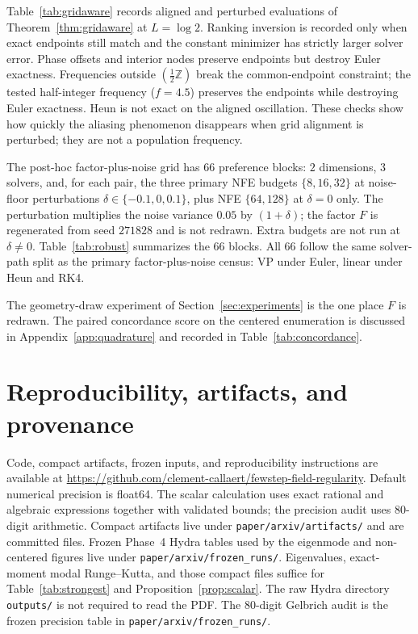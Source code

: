 \documentclass[11pt,a4paper]{article}
\theoremstyle{remark}
\newcommand{\cR}{\mathcal{R}}
\begin{document}
Table~\ref{tab:gridaware} records aligned and perturbed evaluations of
Theorem~\ref{thm:gridaware} at $L=\log 2$. Ranking inversion is recorded
only when exact endpoints still match and the constant minimizer has
strictly larger solver error. Phase offsets and interior nodes preserve
endpoints but destroy Euler exactness. Frequencies outside
$(\tfrac12\mathbb{Z})$ break the common-endpoint constraint; the tested
half-integer frequency ($f=4.5$) preserves the endpoints while destroying
Euler exactness. Heun is not exact on the aligned oscillation.
These checks show how quickly the aliasing phenomenon disappears when
grid alignment is perturbed; they are not a population frequency.

\begin{table}[ht]
  \centering
  \caption{Grid-aware robustness at $L=\log 2$. ``Ends'' records whether
  the two exact endpoints still match. ``Invert'' records whether the
  constant $\cR$-minimizer has strictly larger solver error.}
  \label{tab:gridaware}
  \scriptsize
  
\end{table}


The post-hoc factor-plus-noise grid has $66$ preference blocks:
$2$ dimensions, $3$ solvers, and, for each pair, the three primary NFE
budgets $\{8,16,32\}$ at noise-floor perturbations
$\delta\in\{-0.1,0,0.1\}$, plus NFE $\{64,128\}$ at $\delta=0$ only. The
perturbation multiplies the noise variance $0.05$ by $(1+\delta)$; the
factor $F$ is regenerated from seed $271828$ and is not redrawn. Extra
budgets are not run at $\delta\ne 0$. Table~\ref{tab:robust} summarizes the
$66$ blocks. All $66$ follow the same solver-path split as the primary
factor-plus-noise census: VP under Euler, linear under Heun and RK4.

The geometry-draw experiment of Section~\ref{sec:experiments} is the
one place $F$ is redrawn. The paired concordance score on the centered
enumeration is discussed in Appendix~\ref{app:quadrature} and recorded in
Table~\ref{tab:concordance}.
\section{Reproducibility, artifacts, and provenance}
\label{app:repro}

{\small\raggedright
Code, compact artifacts, frozen inputs, and reproducibility instructions
are available at
\url{https://github.com/clement-callaert/fewstep-field-regularity}.
Default numerical precision is float64. The scalar calculation uses exact
rational and algebraic expressions together with validated bounds; the
precision audit uses $80$-digit arithmetic. Compact artifacts live under
\texttt{paper/arxiv/artifacts/} and are committed files. Frozen Phase~4
Hydra tables used by the eigenmode and non-centered figures live under
\texttt{paper/arxiv/frozen\_runs/}. Eigenvalues, exact-moment modal
Runge--Kutta, and those compact files suffice for
Table~\ref{tab:strongest} and Proposition~\ref{prop:scalar}. The raw
Hydra directory \texttt{outputs/} is not required to read the PDF.
The $80$-digit Gelbrich audit is the frozen precision table in
\texttt{paper/arxiv/frozen\_runs/}.
\par}
\end{document}

